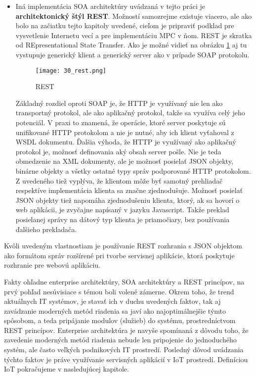 \begin{itemize}
 \item Iná implementácia SOA architektúry uvádzaná v tejto práci je \textbf{architektonický štýl REST}. Možností samozrejme existuje viacero, ale ako bolo na začiatku tejto kapitoly uvedené, cieľom je pripraviť podklad pre vysvetlenie Internetu vecí a pre implementáciu MPC v ňom. REST je skratka od REpresentational State Transfer. Ako je možné vidieť na obrázku \ref{30_rest} aj tu vystupuje generický klient a generický server ako v prípade SOAP protokolu.
\begin{figure}[!htbp]
\centering
\texttt{[image: 30\_rest.png]}
\caption{REST \cite{IOT14}}
\label{30_rest}
\end{figure} 
Základný rozdiel oproti SOAP je, že HTTP je využívaný nie len ako transportný protokol, ale ako aplikačný protokol, takže sa využíva celý jeho potenciál. V praxi to znamená, že operácie, ktoré server poskytuje sú unifikované HTTP protokolom a nie je nutné, aby ich klient vyťahoval z WSDL dokumentu. Ďalšia výhoda, že HTTP je využívaný ako aplikačný protokol je, možnosť definovania aký obsah server pošle. Nie je teda obmedzenie na XML dokumenty, ale je možnosť posielať JSON objekty, binárne objekty a všetky ostatné typy správ podporované HTTP protokolom. Z uvedeného tiež vyplýva, že klientom môže byť samotný prehliadač respektíve implementácia klienta sa značne zjednodušuje. Možnosť posielať JSON objekty tiež napomáha zjednodušeniu klienta, ktorý, ak sa hovorí o web aplikácii, je zvyčajne napísaný v jazyku Javascript. Takže preklad posielanej správy na dátový typ klienta je priamočiary, bez používania ďalšieho prekladača. 
\end{itemize}
Kvôli uvedeným vlastnostiam je používanie REST rozhrania s JSON objektom ako formátom správ rozšírené pri tvorbe servisnej aplikácie, ktorá poskytuje rozhranie pre webovú aplikáciu.

\indent Fakty ohľadne enterprise architektúry, SOA architektúry a REST princípov, na prvý pohľad nesúvisiace s témou boli volené zámerne. Okrem toho, že trend aktuálnych IT systémov, je stavať ich v duchu uvedených faktov, tak aj zavádzanie moderných metód riadenia sa javí ako najoptimálnejšie týmto spôsobom, a teda pripájanie modulov (služieb) do systému, prostredníctvom REST princípov. Enterprise architektúra je navyše spomínaná z dôvodu toho, že zavedenie moderných metód riadenia nebude len pripojenie do jednoduchého systém, ale často veľkých podnikových IT prostredí. Posledný dôvod uvádzania týchto faktov je práve využívanie servisných aplikácií v IoT prostredí. Definíciou IoT pokračujeme v nasledujúcej kapitole.

